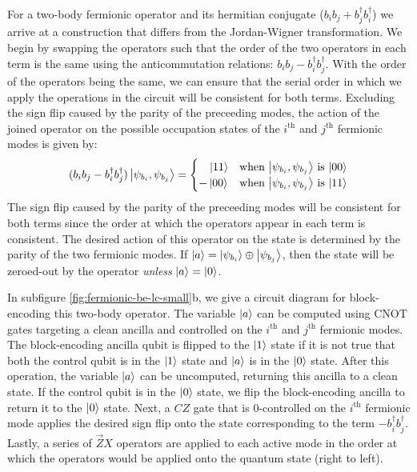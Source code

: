 For a two-body fermionic operator and its hermitian conjugate ($b_i b_j + b_j^\dagger b_i^\dagger$) we arrive at a construction that differs from the Jordan-Wigner transformation.
We begin by swapping the operators such that the order of the two operators in each term is the same using the anticommutation relations: $b_i b_j - b_i^\dagger b_j^\dagger$.
With the order of the operators being the same, we can ensure that the serial order in which we apply the operations in the circuit will be consistent for both terms.
Excluding the sign flip caused by the parity of the preceeding modes, the action of the joined operator on the possible occupation states of the $i^\text{th}$ and $j^\text{th}$ fermionic modes is given by:
\begin{equation}
    \begin{split}
        (b_i b_j - b_i^\dagger b_j^\dagger) \ket{\psi_{b_i}, \psi_{b_j}} = \begin{cases} 
            \hspace{1em}\ket{11} & \text{when $\ket{\psi_{b_i}, \psi_{b_j}}$ is $\ket{00}$} \\
            -\ket{00} & \text{when $\ket{\psi_{b_i}, \psi_{b_j}}$ is $\ket{11}$} \\
                                        \end{cases}
    \end{split}
\end{equation}
The sign flip caused by the parity of the preceeding modes will be consistent for both terms since the order at which the operators appear in each term is consistent. 
The desired action of this operator on the state is determined by the parity of the two fermionic modes.
If $\ket{a} = \ket{\psi_{b_i}} \oplus \ket{\psi_{b_j}}$, then the state will be zeroed-out by the operator \textit{unless} $\ket{a} = \ket{0}$.

In subfigure \ref{fig:fermionic-be-lc-small}b, we give a circuit diagram for block-encoding this two-body operator.
The variable $\ket{a}$ can be computed using CNOT gates targeting a clean ancilla and controlled on the $i^\text{th}$ and $j^\text{th}$ fermionic modes.
The block-encoding ancilla qubit is flipped to the $\ket{1}$ state if it is not true that both the control qubit is in the $\ket{1}$ state and $\ket{a}$ is in the $\ket{0}$ state.
After this operation, the variable $\ket{a}$ can be uncomputed, returning this ancilla to a clean state.
If the control qubit is in the $\ket{0}$ state, we flip the block-encoding ancilla to return it to the $\ket{0}$ state.
Next, a $CZ$ gate that is $0$-controlled on the $i^\text{th}$ fermionic mode applies the desired sign flip onto the state corresponding to the term $-b_i^\dagger b_j^\dagger$.
Lastly, a series of $\vec{Z}X$ operators are applied to each active mode in the order at which the operators would be applied onto the quantum state (right to left).

